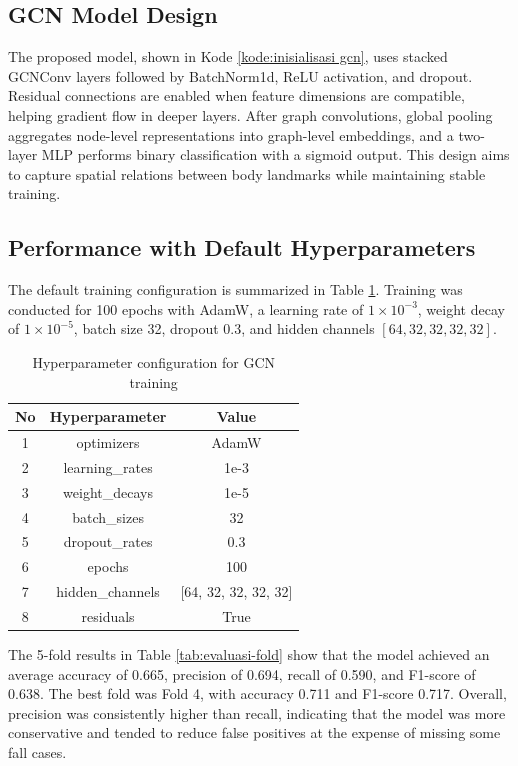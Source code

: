 \documentclass[10pt,TimesNewRoman,a4paper]{matrikenglish}
\begin{document}
\subsection{GCN Model Design}
\label{IV.Perancangan}

The proposed model, shown in Kode \ref{kode:inisialisasi gcn}, uses stacked GCNConv layers followed by BatchNorm1d, ReLU activation, and dropout. Residual connections are enabled when feature dimensions are compatible, helping gradient flow in deeper layers. After graph convolutions, global pooling aggregates node-level representations into graph-level embeddings, and a two-layer MLP performs binary classification with a sigmoid output. This design aims to capture spatial relations between body landmarks while maintaining stable training.

\subsection{Performance with Default Hyperparameters}
\label{IV.evaluasi-default}

The default training configuration is summarized in Table \ref{tab:hyperparams-gcn}. Training was conducted for 100 epochs with AdamW, a learning rate of \(1\times10^{-3}\), weight decay of \(1\times10^{-5}\), batch size 32, dropout 0.3, and hidden channels \([64, 32, 32, 32, 32]\).

\begin{table}[H]
    \centering
    \caption{Hyperparameter configuration for GCN training}
    \label{tab:hyperparams-gcn}
    \begin{tabular}{c c c}
        \hline
        \textbf{No} & \textbf{Hyperparameter} & \textbf{Value} \\ \hline
        1 & optimizers & AdamW \\ 
        2 & learning\_rates & 1e-3 \\ 
        3 & weight\_decays & 1e-5 \\ 
        4 & batch\_sizes & 32 \\ 
        5 & dropout\_rates & 0.3 \\ 
        6 & epochs & 100 \\ 
        7 & hidden\_channels & [64, 32, 32, 32, 32] \\ 
        8 & residuals & True \\ \hline
    \end{tabular}
\end{table}

The 5-fold results in Table \ref{tab:evaluasi-fold} show that the model achieved an average accuracy of 0.665, precision of 0.694, recall of 0.590, and F1-score of 0.638. The best fold was Fold 4, with accuracy 0.711 and F1-score 0.717. Overall, precision was consistently higher than recall, indicating that the model was more conservative and tended to reduce false positives at the expense of missing some fall cases.
\end{document}
